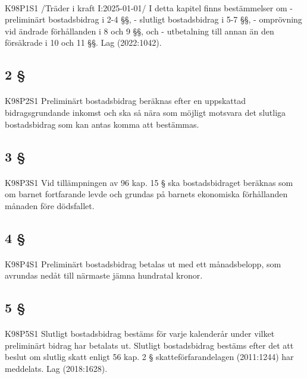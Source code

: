 \documentclass[a4paper,notitlepage,openany,10pt]{book}
\begin{document}
\paragraph*{}
{\tiny K98P1S1}
/Träder i kraft I:2025-01-01/
I detta kapitel finns bestämmelser om
\newline - preliminärt bostadsbidrag i 2-4 §§,
\newline - slutligt bostadsbidrag i 5-7 §§,
\newline - omprövning vid ändrade förhållanden i 8 och 9 §§, och
\newline - utbetalning till annan än den försäkrade i 10 och 11 §§.
Lag (2022:1042).
\subsection*{2 §}
\paragraph*{}
{\tiny K98P2S1}
Preliminärt bostadsbidrag beräknas efter en uppskattad bidragsgrundande inkomst och ska så nära som möjligt motsvara det slutliga bostadsbidrag som kan antas komma att bestämmas.
\subsection*{3 §}
\paragraph*{}
{\tiny K98P3S1}
Vid tillämpningen av 96 kap. 15 § ska bostadsbidraget beräknas som om barnet fortfarande levde och grundas på barnets ekonomiska förhållanden månaden före dödsfallet.
\subsection*{4 §}
\paragraph*{}
{\tiny K98P4S1}
Preliminärt bostadsbidrag betalas ut med ett månadsbelopp, som avrundas nedåt till närmaste jämna hundratal kronor.
\subsection*{5 §}
\paragraph*{}
{\tiny K98P5S1}
Slutligt bostadsbidrag bestäms för varje kalenderår under vilket preliminärt bidrag har betalats ut. Slutligt bostadsbidrag bestäms efter det att beslut om slutlig skatt enligt 56 kap. 2 § skatteförfarandelagen (2011:1244) har meddelats.
Lag (2018:1628).
\end{document}
